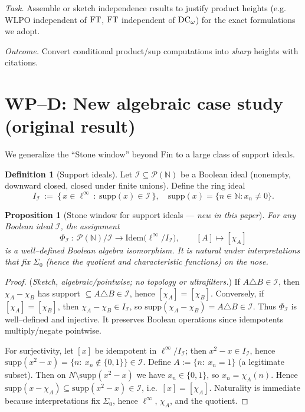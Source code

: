 \documentclass[11pt]{article}
\newtheorem{proposition}[theorem]{Proposition}
\theoremstyle{definition}
\newtheorem{definition}[theorem]{Definition}
\theoremstyle{remark}
\newcommand{\linf}{\ell^\infty}
\newcommand{\WLPO}{\mathrm{WLPO}}
\begin{document}
\emph{Task.} Assemble or sketch independence results to justify product heights (e.g.\ \(\WLPO\) independent of \(\mathrm{FT}\), \(\mathrm{FT}\) independent of \(\mathrm{DC}_\omega\)) for the exact formulations we adopt.

\emph{Outcome.} Convert conditional product/sup computations into \emph{sharp} heights with citations.

\section{WP–D: New algebraic case study (original result)}

We generalize the “Stone window” beyond \(\mathrm{Fin}\) to a large class of support ideals.

\begin{definition}[Support ideals]
Let \(\mathcal I\subseteq \mathcal P(\mathbb N)\) be a Boolean ideal (nonempty, downward closed, closed under finite unions).
Define the ring ideal
\[
I_{\mathcal I}\ :=\ \{\,x\in \linf\ :\ \mathrm{supp}(x)\in\mathcal I\,\},
\quad
\mathrm{supp}(x)=\{n\in\mathbb N: x_n\neq 0\}.
\]
\end{definition}

\begin{proposition}[Stone window for support ideals — \emph{new in this paper}]\label{VI:prop:stone-general}
For any Boolean ideal \(\mathcal I\), the assignment
\[
\Phi_{\mathcal I}\ :\ \mathcal P(\mathbb N)/\mathcal I \longrightarrow \mathrm{Idem}\big(\linf/I_{\mathcal I}\big),
\qquad [A]\longmapsto[\chi_A]
\]
is a well–defined Boolean algebra isomorphism. It is natural under interpretations that fix \(\Sigma_0\) (hence the quotient and characteristic functions) on the nose.
\end{proposition}

\begin{proof}
(\emph{Sketch, algebraic/pointwise; no topology or ultrafilters.})
If \(A\triangle B\in\mathcal I\), then \(\chi_A-\chi_B\) has support \(\subseteq A\triangle B\in\mathcal I\), hence \([\chi_A]=[\chi_B]\).
Conversely, if \([\chi_A]=[\chi_B]\), then \(\chi_A-\chi_B\in I_{\mathcal I}\), so \(\mathrm{supp}(\chi_A-\chi_B)=A\triangle B\in\mathcal I\).
Thus \(\Phi_{\mathcal I}\) is well–defined and injective. It preserves Boolean operations since idempotents multiply/negate pointwise.

For surjectivity, let \([x]\) be idempotent in \(\linf/I_{\mathcal I}\); then \(x^2-x\in I_{\mathcal I}\), hence
\(\mathrm{supp}(x^2-x)=\{n:\ x_n\notin\{0,1\}\}\in\mathcal I\).
Define \(A:=\{n:\ x_n=1\}\) (a legitimate subset). Then on \(N\setminus \mathrm{supp}(x^2-x)\) we have \(x_n\in\{0,1\}\), so \(x_n=\chi_A(n)\).
Hence \(\mathrm{supp}(x-\chi_A)\subseteq \mathrm{supp}(x^2-x)\in\mathcal I\), i.e.\ \([x]=[\chi_A]\). Naturality is immediate because interpretations fix \(\Sigma_0\), hence \(\linf\), \(\chi_A\), and the quotient.
\end{proof}
\end{document}
